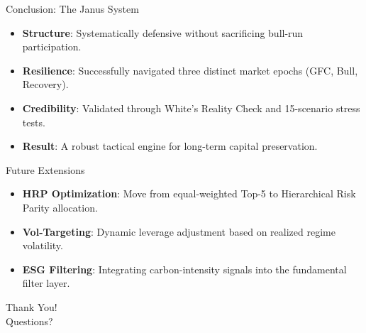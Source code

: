 \documentclass[10pt]{beamer}
\begin{document}
\begin{frame}{Conclusion: The Janus System}
    \begin{itemize}
        \item \textbf{Structure}: Systematically defensive without sacrificing bull-run participation.
        \item \textbf{Resilience}: Successfully navigated three distinct market epochs (GFC, Bull, Recovery).
        \item \textbf{Credibility}: Validated through White's Reality Check and 15-scenario stress tests.
        \item \textbf{Result}: A robust tactical engine for long-term capital preservation.
    \end{itemize}
\end{frame}

\begin{frame}{Future Extensions}
    \begin{itemize}
        \item \textbf{HRP Optimization}: Move from equal-weighted Top-5 to Hierarchical Risk Parity allocation.
        \item \textbf{Vol-Targeting}: Dynamic leverage adjustment based on realized regime volatility.
        \item \textbf{ESG Filtering}: Integrating carbon-intensity signals into the fundamental filter layer.
    \end{itemize}
\end{frame}

\begin{frame}[standout]
    Thank You! \\
    Questions?
\end{frame}
\end{document}
